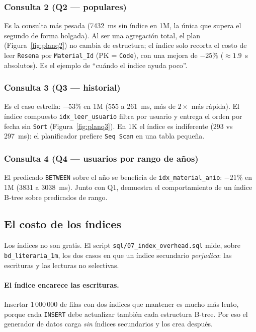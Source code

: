 \documentclass[12pt,a4paper]{article}
\begin{document}
\subsubsection{Consulta 2 (Q2 --- populares)}

Es la consulta más pesada (7432~ms sin índice en 1M, la única que supera el
segundo de forma holgada). Al ser una agregación total, el plan
(Figura~\ref{fig:planq2}) no cambia de estructura; el índice solo recorta el
costo de leer \texttt{Resena} por \texttt{Material\_Id} (PK = \texttt{Code}),
con una mejora de $-25\%$ ($\approx 1.9$~s absolutos). Es el ejemplo de
``cuándo el índice ayuda poco''.

\subsubsection{Consulta 3 (Q3 --- historial)}

Es el caso estrella: $-53\%$ en 1M (555 a 261~ms, más de $2\times$ más rápida).
El índice compuesto \texttt{idx\_leer\_usuario} filtra por usuario y entrega el
orden por fecha sin \texttt{Sort} (Figura~\ref{fig:planq3}). En 1K el índice es
indiferente (293 vs 297~ms): el planificador prefiere \texttt{Seq Scan} en una
tabla pequeña.

\subsubsection{Consulta 4 (Q4 --- usuarios por rango de años)}

El predicado \texttt{BETWEEN} sobre el año se beneficia de
\texttt{idx\_material\_anio}: $-21\%$ en 1M (3831 a 3038~ms). Junto con Q1,
demuestra el comportamiento de un índice B-tree sobre predicados de rango.

\subsection{El costo de los índices}

Los índices no son gratis. El script \texttt{sql/07\_index\_overhead.sql} mide,
sobre \texttt{bd\_literaria\_1m}, los dos casos en que un índice secundario
\emph{perjudica}: las escrituras y las lecturas no selectivas.

\paragraph{El índice encarece las escrituras.}
Insertar 1\,000\,000 de filas con dos índices que mantener es mucho más lento,
porque cada \texttt{INSERT} debe actualizar también cada estructura B-tree. Por
eso el generador de datos carga \emph{sin} índices secundarios y los crea
después.
\end{document}

